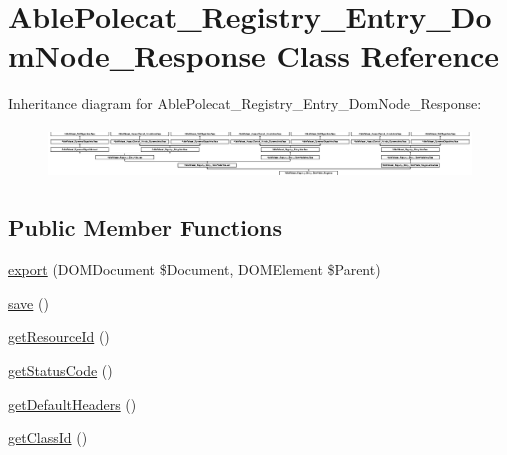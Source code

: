 \hypertarget{class_able_polecat___registry___entry___dom_node___response}{}\section{Able\+Polecat\+\_\+\+Registry\+\_\+\+Entry\+\_\+\+Dom\+Node\+\_\+\+Response Class Reference}
\label{class_able_polecat___registry___entry___dom_node___response}
Inheritance diagram for Able\+Polecat\+\_\+\+Registry\+\_\+\+Entry\+\_\+\+Dom\+Node\+\_\+\+Response\+:\begin{figure}[H]
\begin{center}
\leavevmode
\includegraphics[height=1.363636cm]{class_able_polecat___registry___entry___dom_node___response}
\end{center}
\end{figure}
\subsection*{Public Member Functions}
\begin{DoxyCompactItemize}
\item 
\hyperlink{class_able_polecat___registry___entry___dom_node___response_a0a05b2e4b3a44390eeb042064e427b1a}{export} (D\+O\+M\+Document \$Document, D\+O\+M\+Element \$Parent)
\item 
\hyperlink{class_able_polecat___registry___entry___dom_node___response_afc8a3c62679cf00ade9f15fb2a6d6132}{save} ()
\item 
\hyperlink{class_able_polecat___registry___entry___dom_node___response_a0ac412173b2b1d569ef90a1ac095ca5d}{get\+Resource\+Id} ()
\item 
\hyperlink{class_able_polecat___registry___entry___dom_node___response_a094778dd1c04fe44626000b47ea0c0bb}{get\+Status\+Code} ()
\item 
\hyperlink{class_able_polecat___registry___entry___dom_node___response_af81180728885fac65715855f27abd1ee}{get\+Default\+Headers} ()
\item 
\hyperlink{class_able_polecat___registry___entry___dom_node___response_acc9039051a8b6d4fe7c5ddfbaedbcbcb}{get\+Class\+Id} ()
\end{DoxyCompactItemize}
